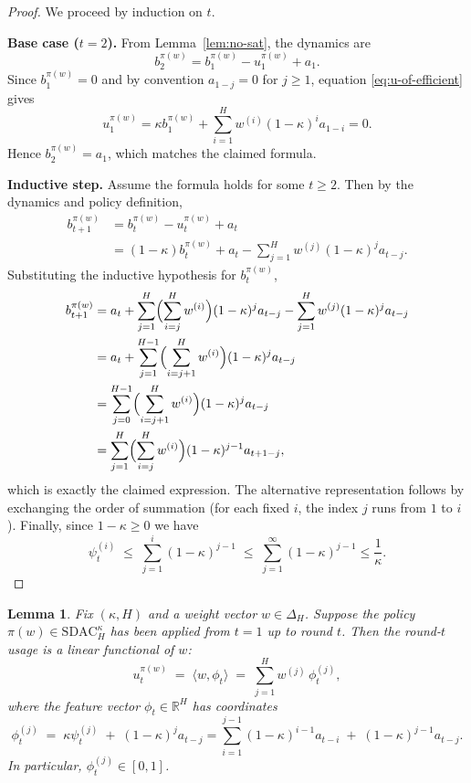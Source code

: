 \documentclass[11pt]{article}
\newtheorem{Thm:Lemma}{Lemma}
\begin{document}
\begin{proof}
We proceed by induction on \(t\).

\textbf{Base case (\(t=2\)).}
From Lemma~\ref{lem:no-sat}, the dynamics are
\[
b_2^{\pi(w)} = b_1^{\pi(w)} - u_1^{\pi(w)} + a_1.
\]
Since \(b_1^{\pi(w)}=0\) and by convention \(a_{1-j}=0\) for \(j\ge 1\), equation \eqref{eq:u-of-efficient} gives
\[
u_1^{\pi(w)} = \kappa b_1^{\pi(w)} + \sum_{i=1}^H w^{(i)} (1-\kappa)^i a_{1-i} = 0.
\]
Hence \(b_2^{\pi(w)} = a_1\), which matches the claimed formula.

\textbf{Inductive step.}
Assume the formula holds for some \(t \ge 2\). Then by the dynamics and policy definition,
\begin{align*}
b_{t+1}^{\pi(w)}
&= b_t^{\pi(w)} - u_t^{\pi(w)} + a_t \\
&= (1-\kappa)b_t^{\pi(w)} + a_t - \sum_{j=1}^H w^{(j)} (1-\kappa)^j a_{t-j}.
\end{align*}
Substituting the inductive hypothesis for \(b_t^{\pi(w)}\),
\begin{align*}
b_{t+1}^{\pi(w)}
&= a_t
+ \sum_{j=1}^{H} \Bigl(\sum_{i=j}^H w^{(i)}\Bigr) (1-\kappa)^{j} a_{t-j}
- \sum_{j=1}^H w^{(j)} (1-\kappa)^j a_{t-j} \\
&= a_t
+ \sum_{j=1}^{H-1} \Bigl(\sum_{i=j+1}^H w^{(i)}\Bigr) (1-\kappa)^j a_{t-j} \\
&= \sum_{j=0}^{H-1} \Bigl(\sum_{i=j+1}^H w^{(i)}\Bigr) (1-\kappa)^j a_{t-j} \\
&= \sum_{j=1}^{H} \Bigl(\sum_{i=j}^H w^{(i)}\Bigr) (1-\kappa)^{j-1} a_{t+1-j},
\end{align*}
which is exactly the claimed expression.  
The alternative representation follows by exchanging the order of summation (for each fixed \(i\), the index \(j\) runs from \(1\) to \(i\)).  
Finally, since $1-\kappa \geq 0$ we have
\[
\psi_t^{(i)} \;\le\; \sum_{j=1}^i (1-\kappa)^{j-1} \;\le\; \sum_{j=1}^\infty (1-\kappa)^{j-1} \le \frac{1}{\kappa}.
\]
\end{proof}




\begin{Thm:Lemma}
\label{lem:prefix-linear}
Fix \((\kappa,H)\) and a weight vector \(w\in\Delta_H\).  
Suppose the policy \(\pi(w)\in\mathrm{SDAC}_H^\kappa\) has been applied from \(t=1\) up to round \(t\).  
Then the round-\(t\) usage is a linear functional of \(w\):
\[
u_t^{\pi(w)} \;=\; \langle w,\phi_t\rangle \;=\; \sum_{j=1}^H w^{(j)}\, \phi_t^{(j)},
\]
where the feature vector \(\phi_t\in\mathbb{R}^H\) has coordinates
\[
\phi_t^{(j)} \;=\; \kappa \psi_t^{(j)} \;+\; (1-\kappa)^j a_{t-j}
= \sum_{i=1}^{j-1} (1-\kappa)^{i-1} a_{t-i} \;+\; (1-\kappa)^{j-1} a_{t-j}.
\]
In particular, \(\phi_t^{(j)} \in [0,1]\).
\end{Thm:Lemma}
\end{document}
